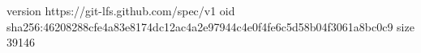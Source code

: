version https://git-lfs.github.com/spec/v1
oid sha256:46208288cfe4a83e8174dc12ac4a2e97944c4e0f4fe6c5d58b04f3061a8bc0c9
size 39146
